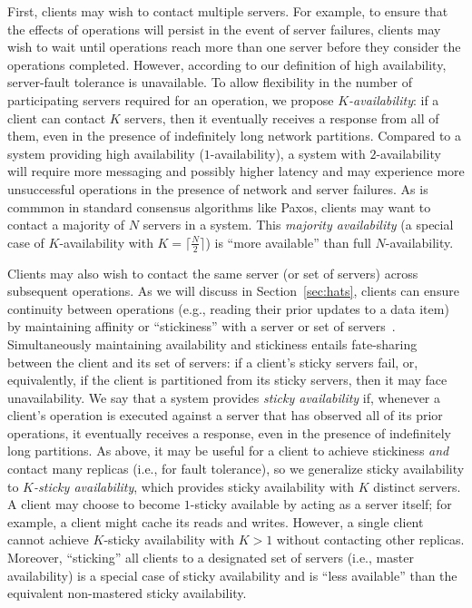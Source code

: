 First, clients may wish to contact multiple servers. For example, to
ensure that the effects of operations will persist in the event of
server failures, clients may wish to wait until operations reach more
than one server before they consider the operations
completed. However, according to our definition of high availability,
server-fault tolerance is unavailable. To allow flexibility in the
number of participating servers required for an operation, we propose
\textit{$K$-availability}: if a client can contact $K$ servers, then
it eventually receives a response from all of them, even in the
presence of indefinitely long network partitions. Compared to a system
providing high availability ($1$-availability), a system with
$2$-availability will require more messaging and possibly higher
latency and may experience more unsuccessful operations in the
presence of network and server failures.  As is commmon in standard
consensus algorithms like Paxos, clients may want to contact a
majority of $N$ servers in a system. This \textit{majority
  availability} (a special case of $K$-availability with $K=\lceil
\frac{N}{2} \rceil$) is ``more available'' than full $N$-availability.

Clients may also wish to contact the same server (or set of servers)
across subsequent operations. As we will discuss in
Section~\ref{sec:hats}, clients can ensure continuity between
operations (e.g., reading their prior updates to a data item) by
maintaining affinity or ``stickiness'' with a server or set of
servers~\cite{vogels-defs}. Simultaneously maintaining availability
and stickiness entails fate-sharing between the client and its set of
servers: if a client's sticky servers fail, or, equivalently, if the
client is partitioned from its sticky servers, then it may face
unavailability. We say that a system provides \textit{sticky
  availability} if, whenever a client's operation is executed against
a server that has observed all of its prior operations, it eventually
receives a response, even in the presence of indefinitely long
partitions. As above, it may be useful for a client to achieve
stickiness \textit{and} contact many replicas (i.e., for fault
tolerance), so we generalize sticky availability to \textit{$K$-sticky
  availability}, which provides sticky availability with $K$ distinct
servers. A client may choose to become $1$-sticky available by acting
as a server itself; for example, a client might cache its reads and
writes. However, a single client cannot achieve $K$-sticky
availability with $K>1$ without contacting other replicas. Moreover, ``sticking'' all clients
to a designated set of servers (i.e., master availability) is a
special case of sticky availability and is ``less available'' than the
equivalent non-mastered sticky availability.

